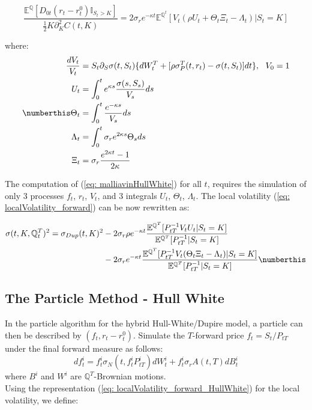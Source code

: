 \begin{equation}\label{eq: malliavinHullWhite}
\frac{ \mathbb{E}^{\mathbb{Q}}[ D_{0t}(r_t-r^0_t)\mathbb{I}_{S_t>K} ]}{ \frac{1}{2}K\partial^2_KC(t,K) } = 
2\sigma_re^{-\kappa t}\mathbb{E}^{\mathbb{Q}^t}[ V_t(\rho U_t + \Theta_t\Xi_t-\Lambda_t)|S_t = K]
\end{equation}

where:
\begin{align*}
  \frac{dV_t}{V_t} &= S_t\partial_S\sigma(t,S_t)\{dW_t^T + [\rho\sigma_P^T(t,r_t)- \sigma(t,S_t) ]dt\} ,\ \ V_0=1\\
  U_t &= \int_0^te^{\kappa s}\frac{\sigma(s,S_s)}{V_s}ds\\ \numberthis \label{eq: malliavinWeights}
  \Theta_t &= \int_0^t\frac{e^{-\kappa s}}{V_s}ds \\  
  \Lambda_t &= \int_0^t\sigma_re^{2\kappa s}\Theta_s ds\\
  \Xi_t &= \sigma_r\frac{e^{2\kappa t}-1}{2\kappa}
\end{align*}

The computation of (\ref{eq: malliavinHullWhite}) for all $t$, requires the simulation of only 3 processes
$f_t$, $r_t$, $V_t$, and 3 integrals $U_t$, $\Theta_t$, $\Lambda_t$.
The local volatility (\ref{eq: localVolatility_forward}) can be now rewritten as:

\begin{align*}
\sigma(t,K,\mathbb{Q}_t^T)^2=  \sigma_{Dup}(t,K)^2 &-2\sigma_r\rho e^{-\kappa t}\frac{\mathbb{E}^{\mathbb{Q}^T}[P_{tT}^{-1}V_tU_t|S_t=K]}{\mathbb{E}^{\mathbb{Q}^T}[P_{tT}^{-1}|S_t=K]} \\ 
 &  -2\sigma_r e^{-\kappa t}\frac{\mathbb{E}^{\mathbb{Q}^T}[P_{tT}^{-1}V_t(\Theta_t\Xi_t-\Lambda_t)|S_t=K]}{\mathbb{E}^{\mathbb{Q}^T}[P_{tT}^{-1}|S_t=K]} \numberthis \label{eq: localVolatility_forward_HullWhite}
\end{align*}

\subsection{The Particle Method - Hull White }
In the particle algorithm for the hybrid Hull-White/Dupire model, a particle can then be described by $(f_t, r_t- r^0_t )$. Simulate the $T$-forward price $f_t = S_t/P_{tT}$ under the final forward measure as follows:
$$ df_t^i=  f_t^i\sigma_N(t,f_t^iP_{tT}^i)dW_t^i+f_t^i\sigma_r A(t,T)dB_t^i $$
where $B^i$ and $W^i$ are $\mathbb{Q}^T$-Brownian motions.\\
Using the representation (\ref{eq: localVolatility_forward_HullWhite}) for the local volatility, we define:

